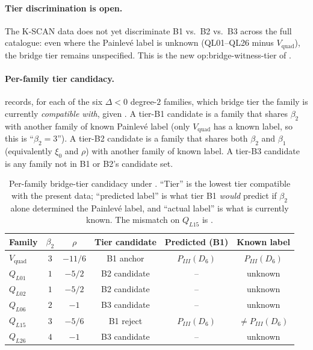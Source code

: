 \documentclass[11pt,reqno]{amsart}
\theoremstyle{plain}
\theoremstyle{definition}
\theoremstyle{remark}
\newcommand{\Vquad}{V_{\mathrm{quad}}}
\begin{document}
\paragraph{Tier discrimination is open.} The K-SCAN data does
not yet discriminate B1 vs.\ B2 vs.\ B3 across the full
catalogue: even where the Painlev\'e label is unknown
(QL01--QL26 minus $\Vquad$), the bridge tier remains
unspecified. This is the new
\textsf{op:bridge-witness-tier} of .

\paragraph{Per-family tier candidacy.}
 records, for each of the six
$\Delta < 0$ degree-$2$ families, which bridge tier the
family is currently \emph{compatible with}, given
. A tier-B1 candidate is a family
that shares $\beta_2$ with another family of known Painlev\'e
label (only $\Vquad$ has a known label, so this is
``$\beta_2 = 3$''). A tier-B2 candidate is a family that
shares both $\beta_2$ and $\beta_1$ (equivalently $\xi_0$ and
$\rho$) with another family of known label. A tier-B3
candidate is any family not in B1 or B2's candidate set.

\begin{table}[ht]
\centering
\small
\caption{Per-family bridge-tier candidacy under
. ``Tier'' is the lowest tier compatible
with the present data; ``predicted label'' is what tier B1
\emph{would} predict if $\beta_2$ alone determined the
Painlev\'e label, and ``actual label''
is what is currently known. The mismatch on $Q_{L15}$ is
.}
\label{tab:bridge-tier}
\begin{tabular}{l c c c c c}
\toprule
Family & $\beta_2$ & $\rho$ & Tier candidate &
  Predicted (B1) & Known label \\
\midrule
$\Vquad$  & $3$ & $-11/6$ & B1 anchor   & $P_{III}(D_6)$ &
   $P_{III}(D_6)$ \\
$Q_{L01}$ & $1$ & $-5/2$  & B2 candidate & --              & unknown \\
$Q_{L02}$ & $1$ & $-5/2$  & B2 candidate & --              & unknown \\
$Q_{L06}$ & $2$ & $-1$    & B3 candidate & --              & unknown \\
$Q_{L15}$ & $3$ & $-5/6$  & B1 reject    & $P_{III}(D_6)$ &
   $\ne P_{III}(D_6)$ \\
$Q_{L26}$ & $4$ & $-1$    & B3 candidate & --              & unknown \\
\bottomrule
\end{tabular}
\end{table}
\end{document}
